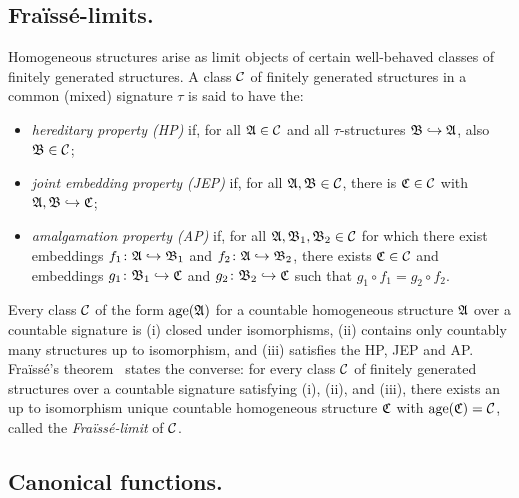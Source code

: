 \subsection*{Fra\"iss\'e-limits.}   Homogeneous structures arise as limit objects of certain well-behaved classes of finitely generated structures.
%
A class $\mathcal{C}$ of finitely generated structures in a common (mixed) signature $\tau$ is said to have the:
%
\begin{itemize}
    \item \emph{hereditary property (HP)} if, for all $\mathfrak{A}\in\mathcal{C}$ and all $\tau$-structures $\mathfrak{B}\hookrightarrow\mathfrak{A}$, also $\mathfrak{B}\in\mathcal{C}$;
    \item \emph{joint embedding property (JEP)} if, for all $\mathfrak{A,B}\in\mathcal{C}$, there is $\mathfrak{C}\in\mathcal{C}$ with $\mathfrak{A},\mathfrak{B}\hookrightarrow\mathfrak{C}$;
    \item \emph{amalgamation property (AP)} if, for all $\mathfrak{A},\mathfrak{B}_1,\mathfrak{B}_2\in\mathcal{C}$ for which there exist embeddings $f_1\colon \mathfrak{A} \hookrightarrow\mathfrak{B}_1$ and $f_2\colon \mathfrak{A}\hookrightarrow \mathfrak{B}_2$, there exists $\mathfrak{C}\in\mathcal{C}$ and embeddings $g_1\colon \mathfrak{B}_1  \hookrightarrow \mathfrak{C}$ and $g_2\colon \mathfrak{B}_2  \hookrightarrow \mathfrak{C}$ such that $g_1\circ f_1 = g_2\circ f_2$.
\end{itemize}
%
Every class $\mathcal{C}$ of the form $\mathrm{age}(\mathfrak{A})$ for a countable homogeneous structure $\mathfrak{A}$ over a countable signature is (i) closed under isomorphisms, (ii) contains only countably many structures up to isomorphism, and (iii) satisfies the HP, JEP and AP.
%
Fra\"iss\'e's theorem~\cite[Theorem 6.1.2]{hodges_book} states the converse: for every class $\mathcal{C}$ of finitely generated structures over a countable signature satisfying (i), (ii), and (iii), there exists an up to isomorphism unique countable homogeneous structure $\mathfrak{C}$ with $\mathrm{age}(\mathfrak{C})=\mathcal{C}$, called the \emph{Fra\"iss\'e-limit} of $\mathcal{C}$.


\subsection*{Canonical functions.}


